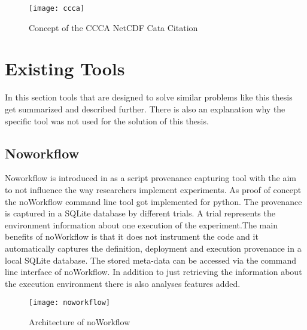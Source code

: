 \documentclass[draft,final]{vutinfth} %
\begin{document}
\begin{figure}[h]
	\centering
	\texttt{[image: ccca]}
	\caption{Concept of the CCCA NetCDF Cata Citation \cite{ccca}}
	\label{fig:ccca} %
\end{figure}

\section{Existing Tools}\label{Existing Tools}
In this section tools that are designed to solve similar problems like this thesis get summarized and described further. There is also an explanation why the specific tool was not used for the solution of this thesis. 

\subsection{Noworkflow}\label{Noworkflow}
Noworkflow is introduced in \cite{c9e0604becba42af96a9cb0a6f60018b} as a script provenance capturing tool with the aim to not influence the way researchers implement experiments. As proof of concept the noWorkflow command line tool got implemented for python. The provenance is captured in a SQLite database by different trials. A trial represents the environment information about one execution of the experiment.The main benefits of noWorkflow is that it does not instrument the code and it automatically captures the definition, deployment and execution provenance in a local SQLite database. The stored meta-data can be accessed via the command line interface of noWorkflow. In addition to just retrieving the information about the execution environment there is also analyses features added.\cite{c9e0604becba42af96a9cb0a6f60018b}

\begin{figure}[h]
	\centering
	\texttt{[image: noworkflow]}
	\caption{Architecture of noWorkflow \cite{c9e0604becba42af96a9cb0a6f60018b}}
	\label{fig:noworkflow} %
\end{figure}
\end{document}
